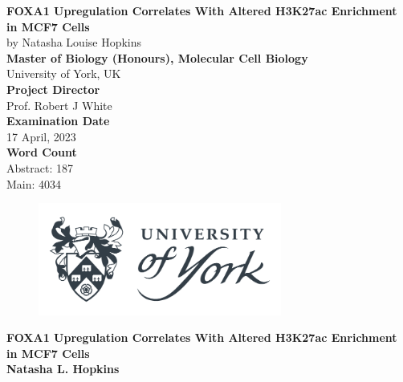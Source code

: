 \documentclass[
  12pt,
]{article}
\author{}
\date{\vspace{-2.5em}}
\begin{document}
\captionsetup{justification=raggedright,singlelinecheck=false}

\begin{center}
\vspace*{2\baselineskip}
\Huge
\textbf{FOXA1 Upregulation Correlates With Altered H3K27ac Enrichment in MCF7 Cells}\\
\vspace*{1\baselineskip}
\Large{by Natasha Louise Hopkins}\\
\vspace*{2\baselineskip}
\Large{\textbf{Master of Biology (Honours), Molecular Cell Biology}}\\
\Large{University of York, UK}\\
\vspace*{2\baselineskip}
\Large{\textbf{Project Director}}\\
Prof. Robert J White\\
\vspace*{2\baselineskip}
\Large{\textbf{Examination Date}}\\
17 April, 2023\\
\vspace*{2\baselineskip}
\Large{\textbf{Word Count}}\\
Abstract: 187\\
Main: 4034\\
\vspace*{2\baselineskip}
\begin{figure}[h!]
\centering
  \includegraphics[width=8cm]{../images/uoy_logo.png}
  \label{}
\end{figure}
\end{center}

\hypersetup{linkcolor = black}
\newpage
\tableofcontents
\hypersetup{linkcolor = teal}
\newpage
\setlength{\columnsep}{25pt}
\linespread{2}
\setlength{\parindent}{0pt}
\huge
\textbf{FOXA1 Upregulation Correlates With Altered H3K27ac Enrichment in MCF7 Cells}\\
\normalsize
\textbf{Natasha L. Hopkins}\\
\end{document}
